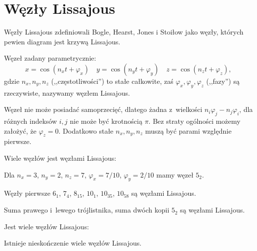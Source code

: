 
\section{Węzły Lissajous}
%
Węzły Lissajous zdefiniowali Bogle, Hearst, Jones i Stoiłow \cite{bogle94} jako węzły, których pewien diagram jest krzywą Lissajous.
%
%
%
%

\begin{definition}
    Węzeł zadany parametrycznie:
    \begin{equation}
        x = \cos(n_xt + \varphi_x) \quad
        y = \cos(n_yt + \varphi_y) \quad
        z = \cos(n_zt + \varphi_z),
    \end{equation}
    gdzie $n_x, n_y, n_z$ (,,częstotliwości'') to stałe całkowite, zaś $\varphi_x, \varphi_y, \varphi_z$ (,,fazy'') są rzeczywiste, nazywamy węzłem Lissajous.
\end{definition}

Węzeł nie może posiadać samoprzecięć, dlatego żadna z~wielkości $n_i\varphi_j-n_j\varphi_i$, dla różnych indeksów $i, j$ nie może być krotnością $\pi$.
Bez straty ogólności możemy założyć, że $\varphi_z = 0$.
Dodatkowo stałe $n_x, n_y, n_z$ muszą być parami względnie pierwsze.

Wiele węzłów jest węzłami Lissajous:


\begin{example}
    Dla $n_x = 3$, $n_y = 2$, $n_z = 7$, $\varphi_x = 7/10$, $\varphi_y = 2/10$ mamy węzeł $5_2$.
\end{example}

\begin{example}
    Węzły pierwsze $6_1$, $7_4$, $8_{15}$, $10_1$, $10_{35}$, $10_{58}$ są węzłami Lissajous.
\end{example}

\begin{example}
    Suma prawego i~lewego trójlistnika, suma dwóch kopii $5_2$ są węzłami Lissajous.
\end{example}

Jest wiele węzłów Lissajous:

\begin{proposition}
    Istnieje nieskończenie wiele węzłów Lissajous.
\end{proposition}

